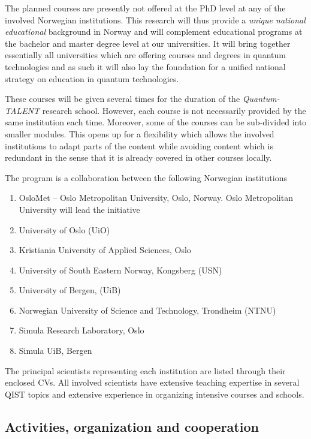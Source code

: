 \documentclass{scrreprt}
\begin{document}
The planned  courses are presently not offered at the PhD level at any
of the involved Norwegian institutions.  This research will thus provide
a \textit{unique national educational} background in
Norway and will complement educational programs at the bachelor and
master degree level at our universities. It will bring together
essentially all universities which are offering courses and degrees in
quantum technologies and as such it will also lay the foundation for a
unified national strategy on education in quantum technologies.

These courses will be given several times for the duration of the \textit{Quantum-TALENT} research school. However, each course is not necessarily provided by the same institution each time. Moreover, some of the courses can be sub-divided into smaller modules. This opens up for a flexibility which allows the involved institutions to adapt parts of the content while avoiding content which is redundant in the sense that it is already covered in other courses locally.

The program is a collaboration between the following Norwegian institutions

\begin{enumerate}
\item OsloMet -- Oslo Metropolitan University, Oslo, Norway. Oslo Metropolitan University will lead the initiative
\item  University of Oslo (UiO)
\item Kristiania University of Applied Sciences, Oslo
\item University of South Eastern Norway, Kongsberg (USN)
\item  University of Bergen, (UiB)
\item Norwegian University of Science and Technology, Trondheim (NTNU)
\item Simula Research Laboratory, Oslo
\item Simula UiB, Bergen
\end{enumerate}
The principal scientists representing each institution are listed through their enclosed CVs. All involved scientists have extensive teaching expertise in several QIST topics and extensive experience in organizing intensive courses and schools. 

\subsection{Activities, organization and cooperation}
\end{document}
